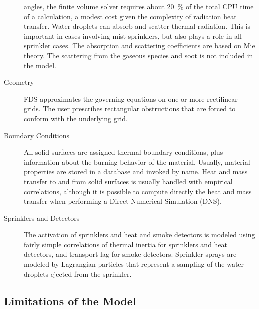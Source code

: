 \documentclass[11pt]{book}
\begin{document}
\begin{description}
angles, the finite volume solver requires about 20~\% of the total CPU
time of a calculation, a modest cost given the complexity of radiation
heat transfer.  Water droplets can absorb and scatter thermal
radiation. This is important in cases involving mist sprinklers, but
also plays a role in all sprinkler cases. The absorption and
scattering coefficients are based on Mie theory. The scattering from
the gaseous species and soot is not included in the model.
\item[Geometry]
FDS approximates the governing equations on one or more rectilinear grids. The
user prescribes rectangular obstructions that are forced to conform
with the underlying grid.
\item[Boundary Conditions]
All solid surfaces are assigned thermal boundary conditions, plus
information about the burning behavior of the material. Usually,
material properties are stored in a database and invoked by name.
Heat and mass transfer to and from solid surfaces is
usually handled with empirical correlations, although it is possible
to compute directly the heat and mass transfer when performing a
Direct Numerical Simulation (DNS).
\item[Sprinklers and Detectors] The activation of sprinklers and heat and smoke detectors
is modeled using fairly simple correlations of thermal inertia for
sprinklers and heat detectors, and transport lag for smoke detectors.
Sprinkler sprays are modeled by Lagrangian particles that represent a sampling of the
water droplets ejected from the sprinkler.
\end{description}


\subsection{Limitations of the Model}
\end{document}
